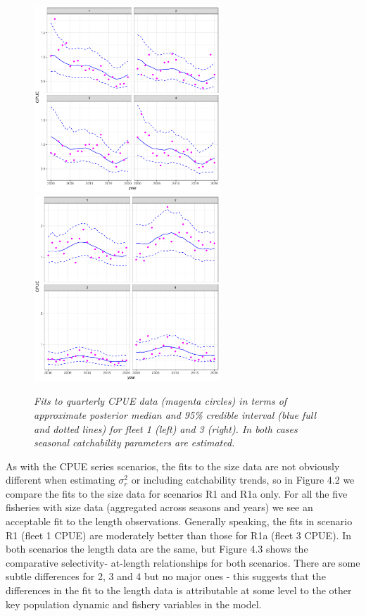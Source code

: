 \documentclass[11pt]{article}
\newcommand{\sigr}{\sigma^2_r}
\begin{document}
\begin{figure}[hb]
    \begin{center}
        \includegraphics[width=7cm,height=7cm]{figs/case4_cpuefits.pdf}\includegraphics[width=7cm,height=7cm]{figs/case4a_cpuefits.pdf}
    \end{center}
    \caption{\textit{Fits to quarterly CPUE data (magenta circles) in terms of approximate posterior
median and 95\% credible interval (blue full and dotted lines) for fleet 1 (left) and 3 (right). In both
cases seasonal catchability parameters are estimated.}}
\end{figure}

As with the CPUE series scenarios, the fits to the size data are not obviously different when
estimating $\sigr$ or including catchability trends, so in Figure 4.2 we compare the fits to the size
data for scenarios R1 and R1a only. For all the five fisheries with size data (aggregated across
seasons and years) we see an acceptable fit to the length observations. Generally speaking, the
fits in scenario R1 (fleet 1 CPUE) are moderately better than those for R1a (fleet 3 CPUE). In
both scenarios the length data are the same, but Figure 4.3 shows the comparative selectivity-
at-length relationships for both scenarios. There are some subtle differences for 2, 3 and 4 but
no major ones - this suggests that the differences in the fit to the length data is attributable at
some level to the other key population dynamic and fishery variables in the model.
\end{document}
